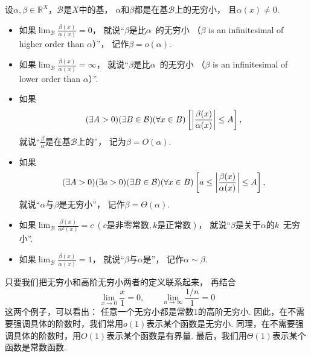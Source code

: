 \begin{definition}\label{definition:无穷小和无穷大.无穷小的比较}
设\(\alpha,\beta\in\mathbb{R}^X\)，\(\mathcal{B}\)是\(X\)中的基，
\(\alpha\)和\(\beta\)都是在基\(\mathcal{B}\)上的无穷小，
且\(\alpha(x)\neq0\).
\newcommand{\lf}[1][]{\lim_\mathcal{B} \frac{\beta(x)}{\alpha^{#1}(x)}}
\begin{itemize}
	\item 如果\(\lf=0\)，
	就说“\(\beta\)是比\(\alpha\)~的无穷小
	（\(\beta\) is an infinitesimal of higher order than \(\alpha\)）”，
	记作\(\beta=o(\alpha)\).

	\item 如果\(\lf=\infty\)，
	就说“\(\beta\)是比\(\alpha\)~的无穷小
	（\(\beta\) is an infinitesimal of lower order than \(\alpha\)）”.

	\item 如果\[
		(\exists A>0)
		(\exists B\in\mathcal{B})
		(\forall x\in B)
		\left[
			\abs{\frac{\beta(x)}{\alpha(x)}} \leq A
		\right],
	\]
	就说“\(\frac\beta\alpha\)是在基\(\mathcal{B}\)上的”，
	记为\(\beta = O(\alpha)\).

	\item 如果\[
		(\exists A>0)
		(\exists a>0)
		(\exists B\in\mathcal{B})
		(\forall x\in B)
		\left[
			a \leq \abs{\frac{\beta(x)}{\alpha(x)}} \leq A
		\right],
	\]
	就说“\(\alpha\)与\(\beta\)是无穷小”，
	记作\(\beta = \Theta(\alpha)\).

	\item 如果\(\lf[k]=c\ (\text{$c$是非零常数},\text{$k$是正常数})\)，
	就说“\(\beta\)是关于\(\alpha\)的\(k\)~无穷小”.

	\item 如果\(\lf=1\)，
	就说“\(\beta\)与\(\alpha\)是”，
	记作\(\alpha\sim\beta\).
\end{itemize}
\end{definition}
\begin{remark}
只要我们把无穷小和高阶无穷小两者的定义联系起来，
再结合\[
	\lim_{x\to0} \frac{x}{1} = 0,
	\qquad
	\lim_{n\to\infty} \frac{1/n}{1} = 0
\]这两个例子，可以看出：
任意一个无穷小都是常数\(1\)的高阶无穷小.
因此，在不需要强调具体的阶数时，我们常用\(o(1)\)表示某个函数是无穷小.
同理，在不需要强调具体的阶数时，用\(O(1)\)表示某个函数是有界量.
最后，我们用\(\Theta(1)\)表示某个函数是常数函数.
\end{remark}

